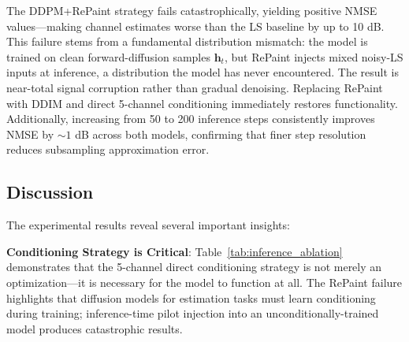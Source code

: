 \documentclass[conference]{IEEEtran}
\begin{document}
\begin{table}[t]
\centering
\caption{Inference Strategy Ablation: NMSE (dB)}
\label{tab:inference_ablation}
\end{table}

The DDPM+RePaint strategy fails catastrophically, yielding positive NMSE values—making channel estimates worse than the LS baseline by up to 10 dB. This failure stems from a fundamental distribution mismatch: the model is trained on clean forward-diffusion samples $\mathbf{h}_t$, but RePaint injects mixed noisy-LS inputs at inference, a distribution the model has never encountered. The result is near-total signal corruption rather than gradual denoising. Replacing RePaint with DDIM and direct 5-channel conditioning immediately restores functionality. Additionally, increasing from 50 to 200 inference steps consistently improves NMSE by ${\sim}1$ dB across both models, confirming that finer step resolution reduces subsampling approximation error.

\subsection{Discussion}

The experimental results reveal several important insights:

\textbf{Conditioning Strategy is Critical}: Table~\ref{tab:inference_ablation} demonstrates that the 5-channel direct conditioning strategy is not merely an optimization—it is necessary for the model to function at all. The RePaint failure highlights that diffusion models for estimation tasks must learn conditioning during training; inference-time pilot injection into an unconditionally-trained model produces catastrophic results.
\end{document}
